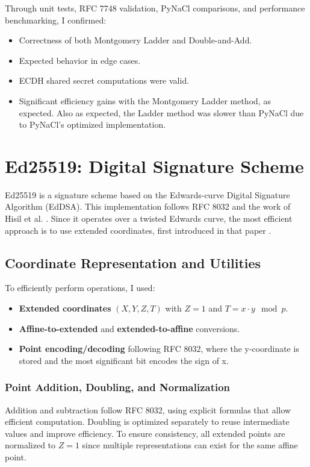 \documentclass[twoside,a4paper,12pt]{article}
\begin{document}
Through unit tests, RFC 7748 validation, PyNaCl comparisons, and performance benchmarking, I confirmed:
\begin{itemize}
    \item Correctness of both Montgomery Ladder and Double-and-Add.
    \item Expected behavior in edge cases.
    \item ECDH shared secret computations were valid.
    \item Significant efficiency gains with the Montgomery Ladder method, as expected. Also as expected, the Ladder method was slower than PyNaCl due to PyNaCl's optimized implementation.
\end{itemize}

\section{Ed25519: Digital Signature Scheme}
\label{sec:ed25519}

Ed25519 is a signature scheme based on the Edwards-curve Digital Signature Algorithm (EdDSA). This implementation follows RFC 8032 \cite{rfc8032} and the work of Hisil et al. \cite{revisited}. Since it operates over a twisted Edwards curve, the most efficient approach is to use extended coordinates, first introduced in that paper \cite{revisited}.

\subsection{Coordinate Representation and Utilities}
To efficiently perform operations, I used:
\begin{itemize}
    \item \textbf{Extended coordinates} $(X, Y, Z, T)$ with $Z = 1$ and $T = x \cdot y \mod p$.
    \item \textbf{Affine-to-extended} and \textbf{extended-to-affine} conversions.
    \item \textbf{Point encoding/decoding} following RFC 8032, where the y-coordinate is stored and the most significant bit encodes the sign of x.
\end{itemize}

\subsubsection{Point Addition, Doubling, and Normalization}
Addition and subtraction follow RFC 8032, using explicit formulas that allow efficient computation. Doubling is optimized separately to reuse intermediate values and improve efficiency. To ensure consistency, all extended points are normalized to $Z = 1$ since multiple representations can exist for the same affine point.
\end{document}
